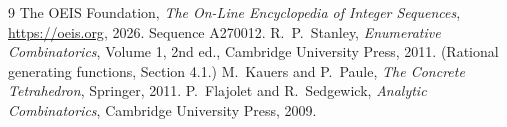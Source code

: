 \documentclass[11pt,a4paper]{article}
\theoremstyle{plain}
\theoremstyle{definition}
\begin{document}
\begin{thebibliography}{9}
 The OEIS Foundation, \emph{The On-Line Encyclopedia of Integer
Sequences}, \url{https://oeis.org}, 2026. Sequence A270012.
 R.~P.~Stanley, \emph{Enumerative Combinatorics}, Volume 1, 2nd ed.,
Cambridge University Press, 2011. (Rational generating functions, Section 4.1.)
 M.~Kauers and P.~Paule, \emph{The Concrete Tetrahedron}, Springer, 2011.
 P.~Flajolet and R.~Sedgewick, \emph{Analytic Combinatorics}, Cambridge
University Press, 2009.
\end{thebibliography}
\end{document}
